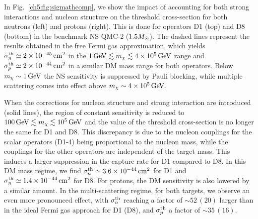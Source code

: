 In Fig.~\ref{ch5:fig:sigmathcomp}, we show the impact of accounting for both strong interactions and nucleon structure on the threshold cross-section for both neutrons (left) and protons (right). This is done for operators D1 (top) and D8 (bottom) in the benchmark NS QMC-2 ($1.5M_\odot$). The dashed lines represent the results obtained in the free Fermi gas approximation, which yields $\sigma^\mathrm{th}_n\simeq2\times10^{-45}{\rm \,cm}^2$ in the $1{\rm \,GeV}\lesssim m_\chi\lesssim 4\times 10^5{\rm \,GeV}$ range and $\sigma^\mathrm{th}_p\simeq2\times10^{-44}{\rm \,cm}^2$ in a similar DM mass range for both operators. Below $m_\chi\sim1{\rm \,GeV}$ the NS sensitivity is suppressed by Pauli blocking, while multiple scattering comes into effect above $m_\chi\sim4\times10^5{\rm \,GeV}$. 

When the corrections for nucleon structure and strong interaction are introduced (solid lines), the region of constant sensitivity is reduced to $100{\rm \,GeV}\lesssim m_\chi\lesssim  10^5{\rm \,GeV}$ and the value of the threshold cross-section is no longer the same for D1 and D8. This discrepancy is due to the nucleon couplings for the scalar operators (D1-4) being proportional to the nucleon mass, while the couplings for the other operators are independent of the target mass. This induces a larger suppression in the capture rate for D1 compared to D8. In this DM mass regime, we find $\sigma^\mathrm{th}_n\simeq3.6\times10^{-44}{\rm \,cm}^2$ for D1 and $\sigma^\mathrm{th}_n\simeq1.4\times10^{-44}{\rm \,cm}^2$  for D8. For protons, the DM sensitivity is also lowered by a similar amount. In the multi-scattering regime, for both targets, we observe an even more pronounced effect, with $\sigma^\mathrm{th}_n$ reaching a factor of $\sim52 \,(20)$ larger than in the ideal Fermi gas approach for D1 (D8), and $\sigma^\mathrm{th}_p$  a factor of $\sim 35 \,(16)$. 

